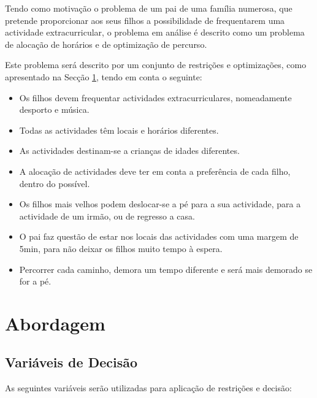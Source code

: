 \documentclass[runningheads]{llncs}
\begin{document}
Tendo como motivação o problema de um pai de uma família numerosa, que pretende proporcionar aos seus filhos a possibilidade de frequentarem uma actividade extracurricular, o problema em análise é descrito como um problema de alocação de horários e de optimização de percurso.

Este problema será descrito por um conjunto de restrições e optimizações, como apresentado na Secção \ref{abordagem}, tendo em conta o seguinte:

\begin{itemize}
	\item Os filhos devem frequentar actividades extracurriculares, nomeadamente desporto e música.
	\item Todas as actividades têm locais e horários diferentes.
	\item As actividades destinam-se a crianças de idades diferentes.
	\item A alocação de actividades deve ter em conta a preferência de cada filho, dentro do possível.
	\item Os filhos mais velhos podem deslocar-se a pé para a sua actividade, para a actividade de um irmão, ou de regresso a casa.
	\item O pai faz questão de estar nos locais das actividades com uma margem de 5min, para não deixar os filhos muito tempo à espera.
	\item Percorrer cada caminho, demora um tempo diferente e será mais demorado se for a pé. 
\end{itemize}

\section{Abordagem}\label{abordagem}

\subsection{Variáveis de Decisão}

As seguintes variáveis serão utilizadas para aplicação de restrições e decisão:
\end{document}

